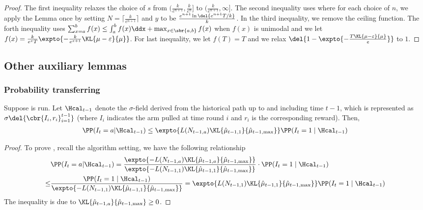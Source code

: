 \begin{proof}
        The first inequality relaxes the choice of $s$ from $(\frac{k}{e^{n+1}}, \frac{k}{e^n}]$ to $(\frac{k}{e^{n+1}}, \infty]$.
        The second inequality uses  where for each choice of $n$, we apply the Lemma once by setting $N = \lceil \frac{k}{e^{n+1}} \rceil$ and $y$ to be $\frac{e^{n+1}\ln\del{ e^{n+1} T/k }}{k}$.
        In the third inequality, we remove the ceiling function.
        The forth inequality uses $\sum_{x=a}^{b} f(x) \leq \int_a^b f(x)\ddx + \max_{x\in\sbr{a,b}} f(x)$ when $f(x)$ is unimodal and we let $f(x) = \frac{k}{e^x T}\expto{-\frac{k}{e^{x+1}}\KL{\mu-\varepsilon}{\mu}}$.
        For last inequality, we let $f(T) = T$ and we relax $\del{1 - \expto{-\frac{T \KL{\mu-\varepsilon}{\mu}}{e}}}$ to $1$.
    \end{proof}

\subsection{Other auxiliary lemmas} 
\subsubsection{Probability transferring}
\begin{lemma} \label{lemma:prob-transfer}
    Suppose  is run.
    Let $\Hcal_{t-1}$ denote the $\sigma$-field derived from the historical path up to and including time $t-1$, which is represented as $\sigma\del{ \cbr{I_i, r_i}_{i=1}^{t-1} }$ (where $I_i$ indicates the arm pulled at time round $i$ and $r_i$ is the corresponding reward). 
    Then, 
    \begin{align}
        \PP(I_t = a|\Hcal_{t-1}) 
        \leq 
        \expto{L(N_{t-1,a}) \KL{\hmu_{t-1,1}}{\hmu_{t-1,\max}}} \PP(I_t = 1 \mid \Hcal_{t-1})
            \label{eqn:prob-transfer}
    \end{align}
    \end{lemma}
    \begin{proof}
        To prove , recall the algorithm setting, we have the following relationship
        \begin{align*}
            & \PP(I_t = a|\Hcal_{t-1})
            =
                \frac{\expto{-L(N_{t-1,a}) \KL{\hmu_{t-1,a}}{\hmu_{t-1,\max}} }}
                     {\expto{-L(N_{t-1,1}) \KL{\hmu_{t-1,1}}{\hmu_{t-1,\max}} }}
                \cdot
                \PP(I_t = 1 \mid \Hcal_{t-1})
            \\
            \leq&
                \frac{ \PP(I_t = 1 \mid \Hcal_{t-1}) }
                     {\expto{-L(N_{t-1,1}) \KL{\hmu_{t-1,1}}{\hmu_{t-1,\max}} }}                
            =
                \expto{L(N_{t-1,1}) \KL{\hmu_{t-1,1}}{\hmu_{t-1,\max}} }
                \PP(I_t = 1 \mid \Hcal_{t-1})
        \end{align*}
        The inequality is due to $ \KL{\hmu_{t-1,a}}{\hmu_{t-1,\max}} \geq 0 $. 
    \end{proof}
